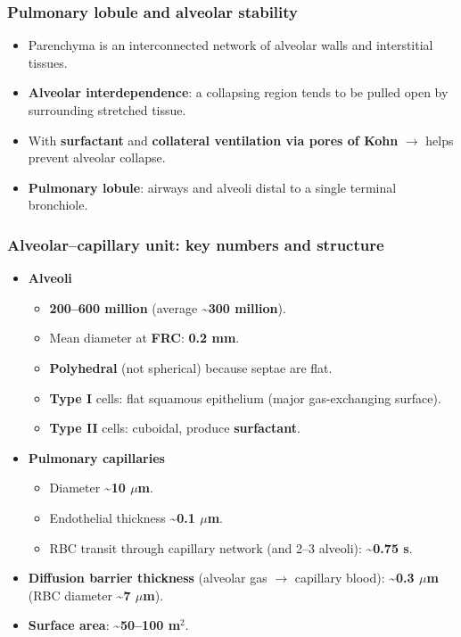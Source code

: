 \documentclass[11pt,a4paper]{article}
\begin{document}
\subsubsection{Pulmonary lobule and alveolar stability}
\begin{itemize}[leftmargin=*,nosep]
  \item Parenchyma is an interconnected network of alveolar walls and interstitial tissues.
  \item \textbf{Alveolar interdependence}: a collapsing region tends to be pulled open by surrounding stretched tissue.
  \item With \textbf{surfactant} and \textbf{collateral ventilation via pores of Kohn} $\rightarrow$ helps prevent alveolar collapse.
  \item \textbf{Pulmonary lobule}: airways and alveoli distal to a single terminal bronchiole.
\end{itemize}

\subsubsection{Alveolar--capillary unit: key numbers and structure}
\begin{itemize}[leftmargin=*,nosep]
  \item \textbf{Alveoli}
  \begin{itemize}[leftmargin=*,nosep]
    \item \textbf{200--600 million} (average \textasciitilde\textbf{300 million}).
    \item Mean diameter at \textbf{FRC}: \textbf{0.2 mm}.
    \item \textbf{Polyhedral} (not spherical) because septae are flat.
    \item \textbf{Type I} cells: flat squamous epithelium (major gas-exchanging surface).
    \item \textbf{Type II} cells: cuboidal, produce \textbf{surfactant}.
  \end{itemize}
  \item \textbf{Pulmonary capillaries}
  \begin{itemize}[leftmargin=*,nosep]
    \item Diameter \textasciitilde\textbf{10 $\mu$m}.
    \item Endothelial thickness \textasciitilde\textbf{0.1 $\mu$m}.
    \item RBC transit through capillary network (and 2--3 alveoli): \textasciitilde\textbf{0.75 s}.
  \end{itemize}
  \item \textbf{Diffusion barrier thickness} (alveolar gas $\rightarrow$ capillary blood): \textasciitilde\textbf{0.3 $\mu$m} (RBC diameter \textasciitilde\textbf{7 $\mu$m}).
  \item \textbf{Surface area}: \textasciitilde\textbf{50--100 m$^2$}.
\end{itemize}
\end{document}
